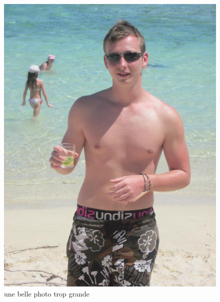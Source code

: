 \documentclass[11pt,a4paper]{article}
\begin{document}
\begin{figure}[h]
	\centering
	\includegraphics{photo.jpg}
	\caption{une belle photo trop grande}
	\label{fig:big_photo}
\end{figure}
\end{document}
